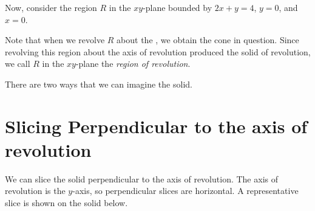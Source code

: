 \documentclass{ximera}
\begin{document}
\begin{model}
Now, consider the region $R$ in the $xy$-plane bounded by $2x+y=4$, $y=0$, and $x=0$.  

 \begin{image}
            \end{image}


Note that when we revolve $R$ about the , we obtain the cone in question.  Since revolving this region about the axis of revolution produced the solid of revolution, we call $R$ in the $xy$-plane the \emph{region of revolution}. 

There are two ways that we can imagine the solid.

\end{model}

\section{Slicing Perpendicular to the axis of revolution}

We can slice the solid perpendicular to the axis of revolution.  The axis of revolution is the $y$-axis, so perpendicular slices are horizontal.  A representative slice is shown on the solid below.
\end{document}
